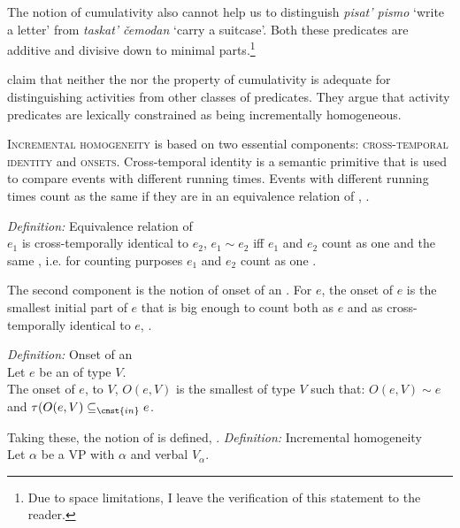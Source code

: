 \documentclass[output=paper,colorlinks,citecolor=brown,newtxmath]{langsci/langscibook}
\begin{document}
\noindent The notion of cumulativity also cannot help us to distinguish \textit{pisat’ pismo} `write a letter’ from \textit{taskat’ čemodan} `carry a suitcase’. Both these predicates are additive and divisive down to minimal parts.\footnote{Due to space limitations, I leave the verification of this statement to the reader.}

\citet{landman2010incremental,landman2012felicity} claim that neither the  nor the property of cumulativity is adequate for distinguishing activities from other classes of predicates. They argue that activity predicates are lexically constrained as being incrementally homogeneous.

\textsc{Incremental homogeneity} is based on two essential components: \textsc{cross-temporal identity} and \textsc{ onsets}. Cross-temporal identity is a semantic primitive that is used to compare events with different running times. Events with different running times count as the same  if they are in an equivalence relation of , .

\eanoraggedright \label{es28}
\textit{Definition:} Equivalence relation of \smallskip\\
$e_1$ is cross-temporally identical to $e_2$, $e_1 \sim e_2$ iff $e_1$ and $e_2$ count as one and the same , i.e. for counting purposes $e_1$ and $e_2$ count as one .
\z

\noindent The second component is the notion of onset of an . For $e$, the onset of $e$ is the smallest initial part of $e$ that is big enough to count both as $e$ and as cross-temporally identical to $e$, .

\ea \label{ex:naumov:29}
\textit{Definition:} Onset of an \smallskip\\
Let $e$ be an  of  type $V$. \\
The onset of $e$,  to $V$, $O(e,V)$ is the smallest  of type $V$ such that: $O(e,V) \sim e$ and $\tau(O(e,V) \subseteq_{\cnst{in}} e$.
\z

\noindent Taking these, the notion of  is defined, .
\ea \label{ex:naumov:30}
\textit{Definition:} Incremental homogeneity\smallskip\\
Let $\alpha$ be a VP with  $\alpha$ and verbal  $V_\alpha$.
\end{document}
